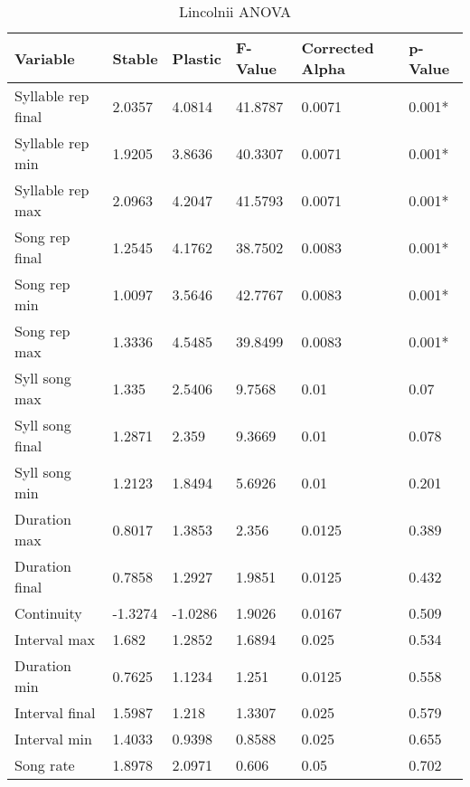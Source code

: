 \documentclass{article}\usepackage[]{graphicx}\usepackage[]{color}
\begin{document}
\begin{table}[ht]
\centering
\caption{Lincolnii ANOVA}
\begin{tabular}{llllll}
  \hline
Variable & Stable & Plastic & F-Value & Corrected Alpha & p-Value \\ 
  \hline
Syllable rep final & 2.0357 & 4.0814 & 41.8787 & 0.0071 & 0.001* \\ 
  Syllable rep min & 1.9205 & 3.8636 & 40.3307 & 0.0071 & 0.001* \\ 
  Syllable rep max & 2.0963 & 4.2047 & 41.5793 & 0.0071 & 0.001* \\ 
  Song rep final & 1.2545 & 4.1762 & 38.7502 & 0.0083 & 0.001* \\ 
  Song rep min & 1.0097 & 3.5646 & 42.7767 & 0.0083 & 0.001* \\ 
  Song rep max & 1.3336 & 4.5485 & 39.8499 & 0.0083 & 0.001* \\ 
  Syll song max & 1.335 & 2.5406 & 9.7568 & 0.01 & 0.07 \\ 
  Syll song final & 1.2871 & 2.359 & 9.3669 & 0.01 & 0.078 \\ 
  Syll song min & 1.2123 & 1.8494 & 5.6926 & 0.01 & 0.201 \\ 
  Duration max & 0.8017 & 1.3853 & 2.356 & 0.0125 & 0.389 \\ 
  Duration final & 0.7858 & 1.2927 & 1.9851 & 0.0125 & 0.432 \\ 
  Continuity & -1.3274 & -1.0286 & 1.9026 & 0.0167 & 0.509 \\ 
  Interval max & 1.682 & 1.2852 & 1.6894 & 0.025 & 0.534 \\ 
  Duration min & 0.7625 & 1.1234 & 1.251 & 0.0125 & 0.558 \\ 
  Interval final & 1.5987 & 1.218 & 1.3307 & 0.025 & 0.579 \\ 
  Interval min & 1.4033 & 0.9398 & 0.8588 & 0.025 & 0.655 \\ 
  Song rate & 1.8978 & 2.0971 & 0.606 & 0.05 & 0.702 \\ 
   \hline
\end{tabular}
\end{table}
\end{document}
